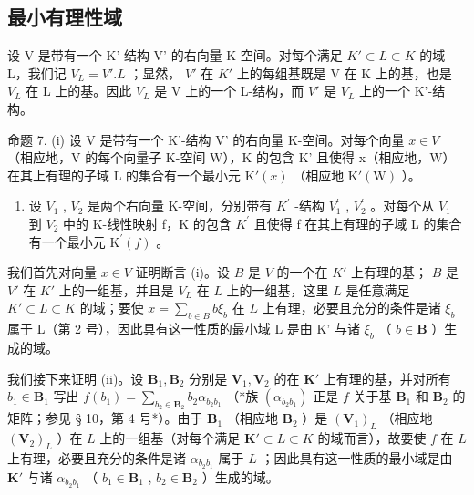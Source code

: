 \subsection{最小有理性域}

设 V 是带有一个 K'-结构 V' 的右向量 K-空间。对每个满足 \(K' \subset L \subset K\) 的域 L，我们记 \(V_{L} = V'. L\) ；显然， \(V'\) 在 \(K'\) 上的每组基既是 V 在 K 上的基，也是 \(V_{L}\) 在 L 上的基。因此 \(V_{L}\) 是 V 上的一个 L-结构，而 \(V'\) 是 \(V_{L}\) 上的一个 K'-结构。

命题 7. (i) 设 V 是带有一个 K'-结构 V' 的右向量 K-空间。对每个向量 \(x \in V\) （相应地，V 的每个向量子 K-空间 W），K 的包含 K' 且使得 x（相应地，W）在其上有理的子域 L 的集合有一个最小元 \(\mathrm{K}'(x)\) （相应地 \(\mathrm{K}'(\mathrm{W})\) ）。

\begin{enumerate}
\def\labelenumi{(\roman{enumi})}
\setcounter{enumi}{1}
\tightlist
\item
  设 \(V_{1}\) , \(V_{2}\) 是两个右向量 K-空间，分别带有 \(K^{\prime}\) -结构 \(V_{1}^{\prime}\) , \(V_{2}^{\prime}\) 。对每个从 \(V_{1}\) 到 \(V_{2}\) 中的 K-线性映射 f，K 的包含 \(K^{\prime}\) 且使得 f 在其上有理的子域 L 的集合有一个最小元 \(\mathrm{K}^{\prime}(f)\) 。
\end{enumerate}

我们首先对向量 \(x \in V\) 证明断言 (i)。设 \(B\) 是 \(V\) 的一个在 \(K'\) 上有理的基； \(B\) 是 \(V'\) 在 \(K'\) 上的一组基，并且是 \(V_L\) 在 \(L\) 上的一组基，这里 \(L\) 是任意满足 \(K' \subset L \subset K\) 的域；要使 \(x = \sum_{b \in B} b\xi_b\) 在 \(L\) 上有理，必要且充分的条件是诸 \(\xi_{b}\) 属于 L（第 2 号），因此具有这一性质的最小域 L 是由 K' 与诸 \(\xi_{b}\) （ \(b \in \mathbf{B}\) ）生成的域。

我们接下来证明 (ii)。设 \(\mathbf{B}_1, \mathbf{B}_2\) 分别是 \(\mathbf{V}_1, \mathbf{V}_2\) 的在 \(\mathbf{K}'\) 上有理的基，并对所有 \(b_1 \in \mathbf{B}_1\) 写出 \(f(b_1) = \sum_{b_2 \in \mathbf{B}_2} b_2 \alpha_{b_2 b_1}\) （*族 \((\alpha_{b_2 b_1})\) 正是 \(f\) 关于基 \(\mathbf{B}_1\) 和 \(\mathbf{B}_2\) 的矩阵；参见 § 10，第 4 号*）。由于 \(\mathbf{B}_1\) （相应地 \(\mathbf{B}_2\) ）是 \((\mathbf{V}_1)_L\) （相应地 \((\mathbf{V}_2)_L\) ）在 \(L\) 上的一组基（对每个满足 \(\mathbf{K}' \subset L \subset K\) 的域而言），故要使 \(f\) 在 \(L\) 上有理，必要且充分的条件是诸 \(\alpha_{b_2 b_1}\) 属于 \(L\) ；因此具有这一性质的最小域是由 \(\mathbf{K}'\) 与诸 \(\alpha_{b_2 b_1}\) （ \(b_1 \in \mathbf{B}_1\) , \(b_2 \in \mathbf{B}_2\) ）生成的域。

